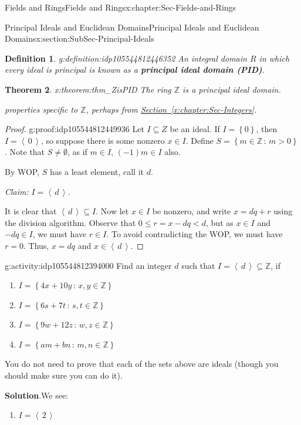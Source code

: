 \documentclass[oneside,10pt,]{book}
\newcommand{\blocktitlefont}{\relax}
\newcommand{\xreffont}{\relax}
\newcommand{\terminology}[1]{\textbf{#1}}
\numberwithin{equation}{section}
\renewcommand{\le}{\leqslant}
\newcommand{\ideal}[1]{\left\langle\, #1 \,\right\rangle}
\newcommand{\set}[1]{\left\{ {#1} \right\}}
\newcommand{\setof}[2]{{\left\{#1\,\colon\,#2\right\}}}
\def\Z{{\mathbb Z}}
\newtheorem{theorem}{Theorem}[section]
\newtheorem{definition}[theorem]{Definition}
\newcommand{\lt}{<}
\begin{document}
\begin{chapterptx}{Fields and Rings}{}{Fields and Rings}{}{}{x:chapter:Sec-Fields-and-Rings}
\begin{sectionptx}{Principal Ideals and Euclidean Domains}{}{Principal Ideals and Euclidean Domains}{}{}{x:section:SubSec-Principal-Ideals}
\begin{definition}{}{g:definition:idp105544812446352}%
An integral domain \(R\) in which every ideal is principal is known as a \terminology{principal ideal domain (PID)}.%
\end{definition}
\begin{theorem}{}{}{x:theorem:thm_ZisPID}%
The ring \(\Z\) is a principal ideal domain.%
\par\smallskip%
\noindentUse properties specific to \(\Z\), perhaps from \hyperref[x:chapter:Sec-Integers]{Section~{\xreffont\ref{x:chapter:Sec-Integers}}}.%
\end{theorem}
\begin{proof}{}{g:proof:idp105544812449936}
Let \(I\subseteq Z\) be an ideal. If \(I = \set{0}\), then \(I = \ideal{0}\), so suppose there is some nonzero \(x\in I\). Define \(S = \setof{m\in \Z}{m > 0}\). Note that \(S\ne \emptyset\), as if \(m\in I\), \((-1)m \in I\) also.%
\par
By WOP, \(S\) has a least element, call it \(d\).%
\par
\emph{Claim:} \(I = \ideal{d}\).%
\par
It is clear that \(\ideal{d}\subseteq I\). Now let \(x\in I\) be nonzero, and write \(x = dq + r\) using the division algorithm. Observe that \(0 \le r = x - dq \lt d\), but as \(x\in I\) and \(-dq \in I\), we must have \(r\in I\). To avoid contradicting the WOP, we must have \(r = 0\). Thus, \(x = dq\) and \(x\in \ideal{d}\).%
\end{proof}
\begin{activity}{}{g:activity:idp105544812394000}%
Find an integer \(d\) such that \(I = \ideal{d}\subseteq \Z\), if%
\begin{enumerate}
\item{}\(\displaystyle I = \setof{4x+10y}{x,y\in\Z}\)%
\item{}\(\displaystyle I = \setof{6s+7t}{s,t\in\Z}\)%
\item{}\(\displaystyle I = \setof{9w+12z}{w,z\in\Z}\)%
\item{}\(\displaystyle I = \setof{am+bn}{m,n\in\Z}\)%
\end{enumerate}
%
\par
You do not need to prove that each of the sets above are ideals (though you should make sure you can do it).%
\par\smallskip%
\noindent\textbf{\blocktitlefont Solution}.\hypertarget{g:solution:idp105544812400144}{}\quad{}We see:%
\begin{enumerate}
\item{}\(\displaystyle I= \ideal{2}\)%

\end{enumerate}
\end{activity}
\end{sectionptx}
\end{chapterptx}
\end{document}
